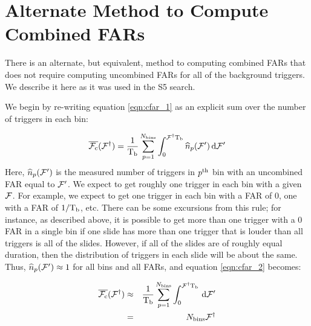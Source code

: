 \section{Alternate Method to Compute Combined FARs}
\label{sec:alternate_cfar_method}

There is an alternate, but equivalent, method to computing combined \acp{FAR} that does not require computing uncombined \acp{FAR} for all of the background triggers. We describe it here as it was used in the \ac{S5} search.

We begin by re-writing equation \ref{eqn:cfar_1} as an explicit sum over the number of triggers in each bin:

\begin{equation}
\label{eqn:cfar_2}
\overline{\cfar}( \far^\dagger ) = \frac{1}{\Tb} \sum_{p=1}^{N_{\mathrm{bins}}} \int_{0}^{\far^\dagger \Tb} \widehat{n}_p( \far' ) \d \far'
\end{equation}
Here, $\widehat{n}_p( \mathcal{F}' )$ is the measured number of triggers in $p^{\mathrm{th}}$ bin with an uncombined \ac{FAR} equal to $\mathcal{F}'$. We expect to get roughly one trigger in each bin with a given $\mathcal{F}$. For example, we expect to get one trigger in each bin with a \ac{FAR} of 0, one with a \ac{FAR} of $1/\mathrm{T_b}$, etc. There can be some excursions from this rule; for instance, as described above, it is possible to get more than one trigger with a 0 \ac{FAR} in a single bin if one slide has more than one trigger that is louder than all triggers is all of the slides. However, if all of the slides are of roughly equal duration, then the distribution of triggers in each slide will be about the same. Thus, $\widehat{n}_p(\mathcal{F}') \approx 1$ for all bins and all \acp{FAR}, and equation \ref{eqn:cfar_2} becomes:

\begin{eqnarray}
\label{eqn:cfar_3}
\overline{\cfar}( \far^\dagger ) & \approx & \frac{1}{\Tb} \sum_{p=1}^{N_{\mathrm{bins}}} \int_{0}^{\far^\dagger \Tb} \d \far' \nonumber \\
 & = & N_{\mathrm{bins}} \far^\dagger
\end{eqnarray}

